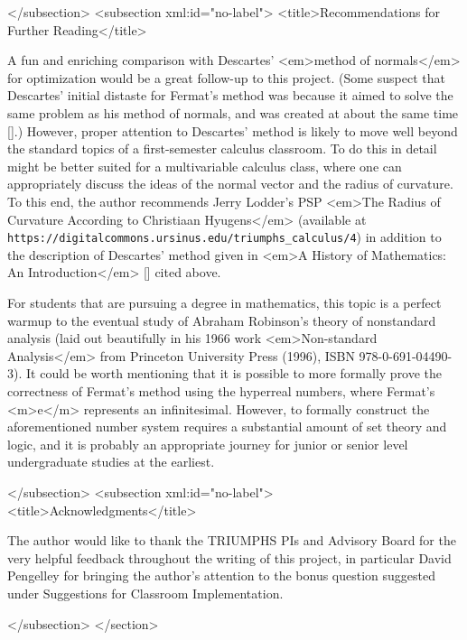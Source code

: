 \begin{refsection}
 \printbibliography[heading=subbibliography]


</subsection>
<subsection xml:id="no-label">
<title>Recommendations for Further Reading</title>


A fun and enriching comparison with Descartes' <em>method of
  normals</em> for optimization would be a great follow-up to this
project.  (Some suspect that Descartes' initial distaste for Fermat's
method was because it aimed to solve the same problem as his method of
normals, and was created at about the same time [\cite[pages 472 and
473]{Katz}].)  However, proper attention to Descartes' method is
likely to move well beyond the standard topics of a first-semester
calculus classroom.  To do this in detail might be better suited for a
multivariable calculus class, where one can appropriately discuss the
ideas of the normal vector and the radius of curvature.  To this end,
the author recommends Jerry Lodder's PSP <em>The Radius of Curvature
  According to Christiaan Hyugens</em> (available at {\tt
  https://digitalcommons.ursinus.edu/triumphs\_calculus/4}) in
addition to the description of Descartes' method given in <em>A
  History of Mathematics: An Introduction</em> [\cite{Katz}] cited above.

For students that are pursuing a degree in mathematics, this topic is
a perfect warmup to the eventual study of Abraham Robinson's theory of
nonstandard analysis (laid out beautifully in his 1966 work
<em>Non-standard Analysis</em> from Princeton University Press (1996),
ISBN 978-0-691-04490-3).  It could be worth mentioning that it is
possible to more formally prove the correctness of Fermat's method
using the hyperreal numbers, where Fermat's <m>e</m> represents an
infinitesimal.  However, to formally construct the aforementioned
number system requires a substantial amount of set theory and logic,
and it is probably an appropriate journey for junior or senior level
undergraduate studies at the earliest.



</subsection>
<subsection xml:id="no-label">
<title>Acknowledgments</title>

The author would like to thank the TRIUMPHS PIs and
 Advisory Board for the very helpful feedback throughout the writing
 of this project, in particular David Pengelley for bringing the
 author's attention to the bonus question suggested under Suggestions
 for Classroom Implementation.

 \end{refsection}










</subsection>
</section>
